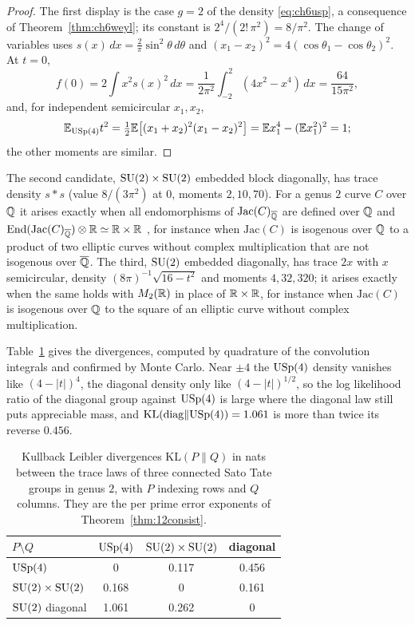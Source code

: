 \begin{proof}
The first display is the case $g=2$ of the density \eqref{eq:ch6usp}, a consequence of Theorem~\ref{thm:ch6weyl}; its constant is $2^4/(2!\,\pi^2)=8/\pi^2$. The change of variables uses $s(x)\,dx=\frac2\pi\sin^2\theta\,d\theta$ and $(x_1-x_2)^2=4(\cos\theta_1-\cos\theta_2)^2$. At $t=0$,
\[
f(0)=2\int x^2s(x)^2\,dx=\frac{1}{2\pi^2}\int_{-2}^2(4x^2-x^4)\,dx=\frac{64}{15\pi^2},
\]
and, for independent semicircular $x_1,x_2$,
\[
\mathbb{E}_{\mathrm{USp}(4)}t^2=\tfrac12\mathbb{E}\bigl[(x_1+x_2)^2(x_1-x_2)^2\bigr]=\mathbb{E} x_1^4-(\mathbb{E} x_1^2)^2=1;
\]
the other moments are similar.
\end{proof}

The second candidate, $\mathrm{SU}(2)\times\mathrm{SU}(2)$ embedded block diagonally, has trace density $s*s$ (value $8/(3\pi^2)$ at $0$, moments $2,10,70$). For a genus $2$ curve $C$ over $\mathbb{Q}$ it arises exactly when all endomorphisms of $\mathrm{Jac}(C)_{\overline{\mathbb{Q}}}$ are defined over $\mathbb{Q}$ and $\mathrm{End}(\mathrm{Jac}(C)_{\overline{\mathbb{Q}}})\otimes\mathbb{R}\simeq\mathbb{R}\times\mathbb{R}$ \cite{fkrs2012}, for instance when $\mathrm{Jac}(C)$ is isogenous over $\mathbb{Q}$ to a product of two elliptic curves without complex multiplication that are not isogenous over $\overline{\mathbb{Q}}$. The third, $\mathrm{SU}(2)$ embedded diagonally, has trace $2x$ with $x$ semicircular, density $(8\pi)^{-1}\sqrt{16-t^2}$ and moments $4,32,320$; it arises exactly when the same holds with $M_2(\mathbb{R})$ in place of $\mathbb{R}\times\mathbb{R}$, for instance when $\mathrm{Jac}(C)$ is isogenous over $\mathbb{Q}$ to the square of an elliptic curve without complex multiplication.

Table~\ref{tab:12kl} gives the divergences, computed by quadrature of the convolution integrals and confirmed by Monte Carlo. Near $\pm4$ the $\mathrm{USp}(4)$ density vanishes like $(4-|t|)^4$, the diagonal density only like $(4-|t|)^{1/2}$, so the log likelihood ratio of the diagonal group against $\mathrm{USp}(4)$ is large where the diagonal law still puts appreciable mass, and $\mathrm{KL}(\text{diag}\|\mathrm{USp}(4))=1.061$ is more than twice its reverse $0.456$.

\begin{table}[htbp]\centering\small
\begin{tabular}{lccc}
\toprule
$P\setminus Q$ & $\mathrm{USp}(4)$ & $\mathrm{SU}(2)\times\mathrm{SU}(2)$ & diagonal\\
\midrule
$\mathrm{USp}(4)$ & 0 & 0.117 & 0.456\\
$\mathrm{SU}(2)\times\mathrm{SU}(2)$ & 0.168 & 0 & 0.161\\
$\mathrm{SU}(2)$ diagonal & 1.061 & 0.262 & 0\\
\bottomrule
\end{tabular}
\caption{Kullback Leibler divergences $\mathrm{KL}(P\|Q)$ in nats between the trace laws of three connected Sato Tate groups in genus $2$, with $P$ indexing rows and $Q$ columns. They are the per prime error exponents of Theorem~\ref{thm:12consist}.}\label{tab:12kl}
\end{table}

